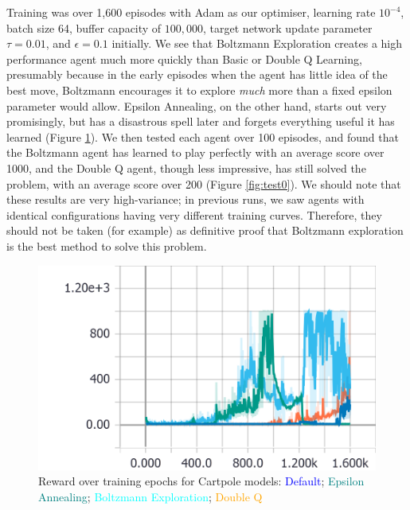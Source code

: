 \documentclass[a4paper, 11pt, conference]{ieeeconf}      %
\begin{document}
Training was over 1,600 episodes with Adam as our optimiser, learning rate $10^{-4}$, batch size 64, buffer capacity of $100,000$, target network update parameter $\tau=0.01$, and $\epsilon=0.1$ initially. We see that Boltzmann Exploration creates a high performance agent much more quickly than Basic or Double Q Learning, presumably because in the early episodes when the agent has little idea of the best move, Boltzmann encourages it to explore \textit{much} more than a fixed epsilon parameter would allow. Epsilon Annealing, on the other hand, starts out very promisingly, but has a disastrous spell later and forgets everything useful it has learned (Figure \ref{fig:train0}). We then tested each agent over 100 episodes, and found that the Boltzmann agent has learned to play perfectly with an average score over 1000, and the Double Q agent, though less impressive, has still solved the problem, with an average score over 200 (Figure \ref{fig:test0}). We should note that these results are very high-variance; in previous runs, we saw agents with identical configurations having very different training curves. Therefore, they should not be taken (for example) as definitive proof that Boltzmann exploration is the best method to solve this problem.

\begin{figure}
  \includegraphics[width=\linewidth]{figs/cartpole_reward.png}
  \caption{Reward over training epochs for Cartpole models: \textcolor{blue}{Default}; \textcolor{teal}{Epsilon Annealing}; \textcolor{cyan}{Boltzmann Exploration}; \textcolor{orange}{Double Q}}
  \label{fig:train0}
\end{figure}
\end{document}
